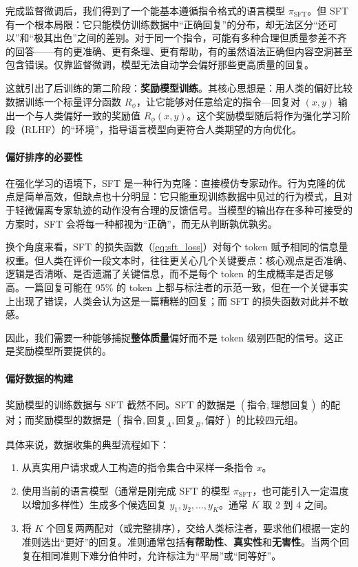 完成监督微调后，我们得到了一个能基本遵循指令格式的语言模型 $\pi_{\text{SFT}}$。但 SFT 有一个根本局限：它只能模仿训练数据中“正确回复”的分布，却无法区分“还可以”和“极其出色”之间的差别。对于同一个指令，可能有多种合理但质量参差不齐的回答——有的更准确、更有条理、更有帮助，有的虽然语法正确但内容空洞甚至包含错误。仅靠监督微调，模型无法自动学会偏好那些更高质量的回复。

这就引出了后训练的第二阶段：\textbf{奖励模型训练}。其核心思想是：用人类的偏好比较数据训练一个标量评分函数 $R_\phi$，让它能够对任意给定的指令—回复对 $(x, y)$ 输出一个与人类偏好一致的奖励值 $R_\phi(x, y)$。这个奖励模型随后将作为强化学习阶段（RLHF）的“环境”，指导语言模型向更符合人类期望的方向优化。

\paragraph{偏好排序的必要性}

在强化学习的语境下，SFT 是一种行为克隆：直接模仿专家动作。行为克隆的优点是简单高效，但缺点也十分明显：它只能重现训练数据中见过的行为模式，且对于轻微偏离专家轨迹的动作没有合理的反馈信号。当模型的输出存在多种可接受的方案时，SFT 会将每一种都视为“正确”，而无从判断孰优孰劣。

换个角度来看，SFT 的损失函数（\eqref{eq:sft_loss}）对每个 token 赋予相同的信息量权重。但人类在评价一段文本时，往往更关心几个关键要点：核心观点是否准确、逻辑是否清晰、是否遗漏了关键信息，而不是每个 token 的生成概率是否足够高。一篇回复可能在 95\% 的 token 上都与标注者的示范一致，但在一个关键事实上出现了错误，人类会认为这是一篇糟糕的回复；而 SFT 的损失函数对此并不敏感。

因此，我们需要一种能够捕捉\textbf{整体质量}偏好而不是 token 级别匹配的信号。这正是奖励模型所要提供的。

\paragraph{偏好数据的构建}

奖励模型的训练数据与 SFT 截然不同。SFT 的数据是 $(\text{指令}, \text{理想回复})$ 的配对；而奖励模型的数据是 $(\text{指令}, \text{回复}_A, \text{回复}_B, \text{偏好})$ 的比较四元组。

具体来说，数据收集的典型流程\cite{ouyang2022traininglanguagemodelsfollow}如下：
\begin{enumerate}
    \item 从真实用户请求或人工构造的指令集合中采样一条指令 $x$。
    \item 使用当前的语言模型（通常是刚完成 SFT 的模型 $\pi_{\text{SFT}}$，也可能引入一定温度以增加多样性）生成多个候选回复 $y_1, y_2, \dots, y_K$。通常 $K$ 取 2 到 4 之间。
    \item 将 $K$ 个回复两两配对（或完整排序），交给人类标注者，要求他们根据一定的准则选出“更好”的回复。准则通常包括\textbf{有帮助性}、\textbf{真实性}和\textbf{无害性}\cite{bai2022traininghelpfulharmlessassistant}。当两个回复在相同准则下难分伯仲时，允许标注为“平局”或“同等好”。
\end{enumerate}


